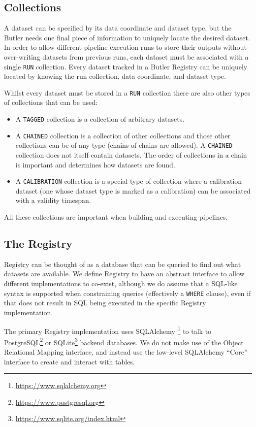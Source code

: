 \documentclass[]{spie}
\begin{document}
\subsection{Collections}

A dataset can be specified by its data coordinate and dataset type, but the Butler needs one final piece of information to uniquely locate the desired dataset.
In order to allow different pipeline execution runs to store their outputs without over-writing datasets from previous runs, each dataset must be associated with a single \texttt{RUN} collection.
Every dataset tracked in a Butler Registry can be uniquely located by knowing the run collection, data coordinate, and dataset type.

Whilst every dataset must be stored in a \texttt{RUN} collection there are also other types of collections that can be used:

\begin{itemize}
\item A \texttt{TAGGED} collection is a collection of arbitrary datasets.
\item A \texttt{CHAINED} collection is a collection of other collections and those other collections can be of any type (chains of chains are allowed).
      A \texttt{CHAINED} collection does not itself contain datasets.
      The order of collections in a chain is important and determines how datasets are found.
\item A \texttt{CALIBRATION} collection is a special type of collection where a calibration dataset (one whose dataset type is marked as a calibration) can be associated with a validity timespan.
\end{itemize}

All these collections are important when building and executing pipelines.

\subsection{The Registry}

Registry can be thought of as a database that can be queried to find out what datasets are available.
We define Registry to have an abstract interface to allow different implementations to co-exist, although we do assume that a SQL-like syntax is supported when constraining queries (effectively a \texttt{WHERE} clause), even if that does not result in SQL being executed in the specific Registry implementation.

The primary Registry implementation uses SQLAlchemy \cite{myers2015essential}\footnote{\url{https://www.sqlalchemy.org}} to talk to PostgreSQL\footnote{\url{https://www.postgresql.org}} or SQLite\footnote{\url{https://www.sqlite.org/index.html}} backend databases.
We do not make use of the Object Relational Mapping interface, and instead use the low-level SQLAlchemy ``Core'' interface to create and interact with tables.
\end{document}
